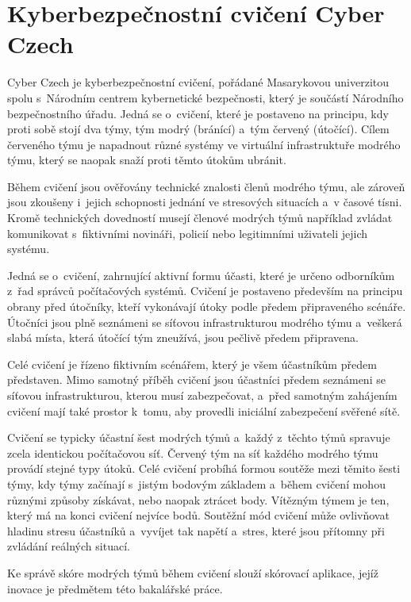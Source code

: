 \documentclass[
  digital,
  twoside,
  table, 
  nolof, 
  nolot
]{fithesis3}
\begin{document}
\section{Kyberbezpečnostní cvičení Cyber Czech}

Cyber Czech je kyberbezpečnostní cvičení, pořádané Masarykovou univerzitou spolu s~Národním centrem kybernetické bezpečnosti, který je součástí Národního bezpečnostního úřadu. Jedná se o~cvičení, které je postaveno na principu, kdy proti sobě stojí dva týmy, tým modrý (bránící) a~tým červený (útočící). Cílem červeného týmu je napadnout různé systémy ve virtuální infrastruktuře modrého týmu, který se naopak snaží proti těmto útokům ubránit.

Během cvičení jsou ověřovány technické znalosti členů modrého týmu, ale zároveň jsou zkoušeny i~jejich schopnosti jednání ve stresových situacích a~v časové tísni. Kromě technických dovedností musejí členové modrých týmů například zvládat komunikovat s~fiktivními novináři, policií nebo legitimními uživateli jejich systému.

Jedná se o~cvičení, zahrnující aktivní formu účasti, které je určeno odborníkům z~řad správců počítačových systémů. Cvičení je postaveno především na principu obrany před útočníky, kteří vykonávají útoky podle předem připraveného scénáře. Útočníci jsou plně seznámeni se síťovou infrastrukturou modrého týmu a~veškerá slabá místa, která útočící tým zneužívá, jsou pečlivě předem připravena.

Celé cvičení je řízeno fiktivním scénářem, který je všem účastníkům předem představen. Mimo samotný příběh cvičení jsou účastníci předem seznámeni se síťovou infrastrukturou, kterou musí zabezpečovat, a~před samotným zahájením cvičení mají také prostor k~tomu, aby provedli iniciální zabezpečení svěřené sítě.

Cvičení se typicky účastní šest modrých týmů a~každý z~těchto týmů spravuje zcela identickou počítačovou síť. Červený tým na síť každého modrého týmu provádí stejné typy útoků. Celé cvičení probíhá formou soutěže mezi těmito šesti týmy, kdy týmy začínají s~jistým bodovým základem a~během cvičení mohou různými způsoby získávat, nebo naopak ztrácet body. Vítězným týmem je ten, který má na konci cvičení nejvíce bodů. Soutěžní mód cvičení může ovlivňovat hladinu stresu účastníků a~vyvíjet tak napětí a~stres, které jsou přítomny při zvládání reálných situací.

Ke správě skóre modrých týmů během cvičení slouží skórovací aplikace, jejíž inovace je předmětem této bakalářské práce. 
\end{document}
